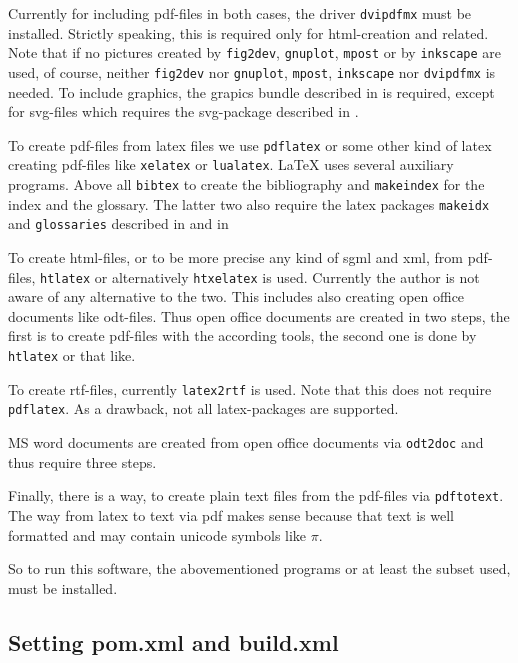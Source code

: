 \documentclass[12pt]{article}
\begin{document}
Currently for including pdf-files in both cases, 
the driver {\tt dvipdfmx} must be installed. 
Strictly speaking, this is required only for html-creation and related. 
Note that if no pictures created by {\tt fig2dev}, {\tt gnuplot}, 
{\tt mpost} or by {\tt inkscape} are used, of course, 
neither {\tt fig2dev} nor {\tt gnuplot}, {\tt mpost}, {\tt inkscape} 
nor {\tt dvipdfmx} is needed. 
To include graphics, the grapics bundle described in \cite{GraX} is required, 
except for svg-files which requires the svg-package 
described in \cite{SvgP}. 

To create pdf-files from latex files we use {\tt pdflatex} 
or some other kind of latex creating pdf-files 
like {\tt xelatex} or {\tt lualatex}. 
LaTeX uses several auxiliary programs. 
Above all {\tt bibtex} to create the bibliography 
and {\tt makeindex} for the index and the glossary. 
The latter two 
also require the latex packages {\tt makeidx} and {\tt glossaries} 
described in \cite{MkidxShIdxP} and in 


To create html-files, or to be more precise any kind of sgml and xml, 
from pdf-files, {\tt htlatex} or alternatively {\tt htxelatex} is used. 
Currently the author is not aware of any alternative to the two. 
This includes also creating open office documents like odt-files. 
Thus open office documents are created in two steps, 
the first is to create pdf-files with the according tools, 
the second one is done by {\tt htlatex} or that like. 

To create rtf-files, currently {\tt latex2rtf} is used. 
Note that this does not require {\tt pdflatex}. 
As a drawback, not all latex-packages are supported. 

MS word documents are created from open office documents via {\tt odt2doc} 
and thus require three steps. 

Finally, there is a way, to create plain text files from the pdf-files 
via {\tt pdftotext}. 
The way from latex to text via pdf makes sense 
because that text is well formatted 
and may contain unicode symbols like $\pi$. 

So to run this software, the abovementioned programs 
or at least the subset used, must be installed. 

\subsection{Setting pom.xml and build.xml}\label{subsec:sgml}
\end{document}
